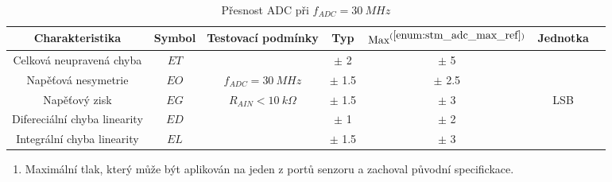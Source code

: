 \begin{table}[H]
    \label{tab:stm_adc_error}
    \caption{Přesnost ADC při $f_{ADC} = 30 \ MHz$}
    \hspace*{-1.3cm}
    \begin{ctucolortab}
        \begin{tabular}{ccccccc}
            \toprule
            Charakteristika               & Symbol & Testovací podmínky       & Typ       & $\textnormal{Max}^{(\ref{enum:stm_adc_max_ref})}$ & Jednotka & \\ \midrule
            Celková neupravená chyba      & $ET$   &                          & $\pm$ 2   & $\pm$ 5                                           &          & \\
            Napěťová nesymetrie           & $EO$   & $f_{ADC} = 30 \ MHz$     & $\pm$ 1.5 & $\pm$ 2.5                                         &          & \\
            Napěťový zisk                 & $EG$   & $R_{AIN} < 10 \ k\Omega$ & $\pm$ 1.5 & $\pm$ 3                                           & LSB      & \\
            Difereciální  chyba linearity & $ED$   &                          & $\pm$ 1   & $\pm$ 2                                           &          & \\
            Integrální chyba linearity    & $EL$   &                          & $\pm$ 1.5 & $\pm$ 3                                           &          & \\
            \bottomrule
        \end{tabular}
    \end{ctucolortab}
    \begin{enumerate}
        \item \label{enum:stm_adc_max_ref} Maximální tlak, který může být aplikován na jeden z portů senzoru a zachoval původní specifickace.
    \end{enumerate}
\end{table}

